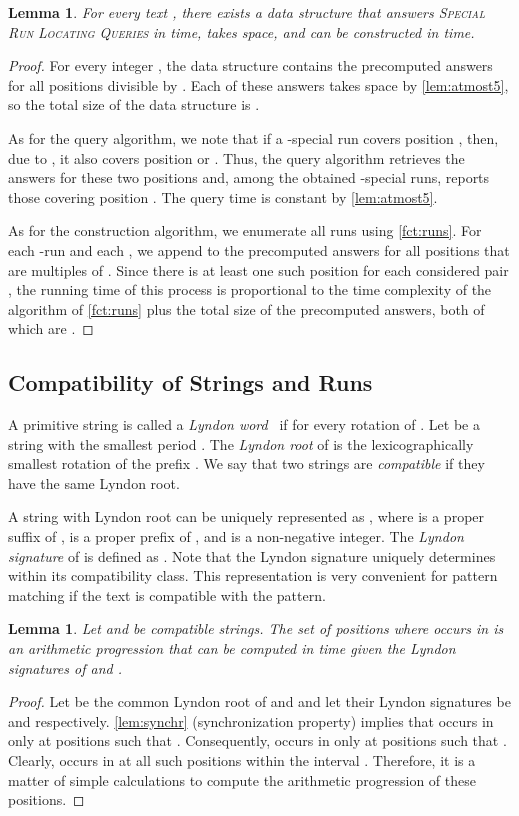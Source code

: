 \documentclass[a4paper]{article}
\newtheorem{lemma}[theorem]{Lemma}
\theoremstyle{definition}
\theoremstyle{remark}
\newcommand{\maybeqed}{}
\begin{document}
\begin{lemma}\label{lem:run_finder}
  For every text , there exists a data structure that answers \textsc{Special Run Locating Queries} in  time,
  takes  space, and can be constructed in  time.
\end{lemma}
\begin{proof}
  For every integer , the data structure contains the precomputed answers for all positions  divisible by .
  Each of these answers takes  space by \cref{lem:atmost5}, so the total size of the data structure is .

  As for the query algorithm, we note that if a -special run  covers position , then,
  due to , it also covers position  or .
  Thus, the query algorithm retrieves the answers for these two positions and, among the obtained -special runs,
  reports those covering position . The query time is constant by \cref{lem:atmost5}.

  As for the construction algorithm, we enumerate all runs using \cref{fct:runs}.
  For each -run  and each ,
  we append  to the precomputed answers for all positions  that are multiples of .
  Since there is at least one such position for each considered pair , the running time of this process
  is proportional to the time complexity of the algorithm of \cref{fct:runs} plus the total size of the precomputed answers, both of which are .
\end{proof}


\subsection{Compatibility of Strings and Runs}\label{sec:comp}
A primitive string  is called a \emph{Lyndon word}~\cite{Lyndon1954,chen1958free} if  for every rotation  of .
Let  be a string with the smallest period .
The \emph{Lyndon root}  of  is the lexicographically smallest rotation of the prefix .
We say that two strings are \emph{compatible} if they have the same Lyndon root.

A string  with Lyndon root  can be uniquely represented as , where  is a proper suffix of ,
  is a proper prefix of , and  is a non-negative integer.
The \emph{Lyndon signature} of  is defined as .
Note that the Lyndon signature uniquely determines  within its compatibility class.
This representation is very convenient for pattern matching if the text is compatible with the pattern.

\begin{lemma}\label{lem:lyndon}
Let  and  be compatible strings.
The set of positions where  occurs in  is an arithmetic progression that
can be computed in  time given the Lyndon signatures of  and .
\end{lemma}
\begin{proof}
Let  be the common Lyndon root of  and 
and let their Lyndon signatures be  and  respectively.
\cref{lem:synchr} (synchronization property) implies that  occurs in 
only at positions  such that .
Consequently,  occurs in  only at positions  such that .
Clearly,  occurs in  at all such positions  within the interval .
Therefore, it is a matter of simple calculations to compute the arithmetic progression of these positions.
\maybeqed \end{proof}
\end{document}
